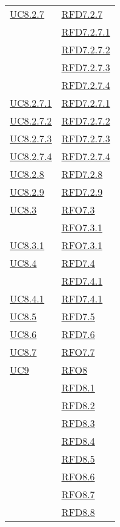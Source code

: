\begin{longtable}{|>{\centering}m{5cm}|m{5cm}<{\centering}|}
\hyperref[UC8.2.7]{UC8.2.7} & \hyperlink{RFD7.2.7}{RFD7.2.7}\\
& \hyperlink{RFD7.2.7.1}{RFD7.2.7.1}\\
& \hyperlink{RFD7.2.7.2}{RFD7.2.7.2}\\
& \hyperlink{RFD7.2.7.3}{RFD7.2.7.3}\\
& \hyperlink{RFD7.2.7.4}{RFD7.2.7.4}\\ \hline
\hyperref[UC8.2.7.1]{UC8.2.7.1} & \hyperlink{RFD7.2.7.1}{RFD7.2.7.1}\\ \hline
\hyperref[UC8.2.7.2]{UC8.2.7.2} & \hyperlink{RFD7.2.7.2}{RFD7.2.7.2}\\ \hline
\hyperref[UC8.2.7.3]{UC8.2.7.3} & \hyperlink{RFD7.2.7.3}{RFD7.2.7.3}\\ \hline
\hyperref[UC8.2.7.4]{UC8.2.7.4} & \hyperlink{RFD7.2.7.4}{RFD7.2.7.4}\\ \hline
\hyperref[UC8.2.8]{UC8.2.8} & \hyperlink{RFD7.2.8}{RFD7.2.8}\\ \hline
\hyperref[UC8.2.9]{UC8.2.9} & \hyperlink{RFD7.2.9}{RFD7.2.9}\\ \hline
\hyperref[UC8.3]{UC8.3} & \hyperlink{RFO7.3}{RFO7.3}\\
& \hyperlink{RFO7.3.1}{RFO7.3.1}\\ \hline
\hyperref[UC8.3.1]{UC8.3.1} & \hyperlink{RFO7.3.1}{RFO7.3.1}\\ \hline
\hyperref[UC8.4]{UC8.4} & \hyperlink{RFD7.4}{RFD7.4}\\
& \hyperlink{RFD7.4.1}{RFD7.4.1}\\ \hline
\hyperref[UC8.4.1]{UC8.4.1} & \hyperlink{RFD7.4.1}{RFD7.4.1}\\ \hline
\hyperref[UC8.5]{UC8.5} & \hyperlink{RFD7.5}{RFD7.5}\\ \hline
\hyperref[UC8.6]{UC8.6} & \hyperlink{RFD7.6}{RFD7.6}\\ \hline
\hyperref[UC8.7]{UC8.7} & \hyperlink{RFO7.7}{RFO7.7}\\ \hline
\hyperref[UC9]{UC9} & \hyperlink{RFO8}{RFO8}\\
& \hyperlink{RFD8.1}{RFD8.1}\\
& \hyperlink{RFD8.2}{RFD8.2}\\
& \hyperlink{RFD8.3}{RFD8.3}\\
& \hyperlink{RFD8.4}{RFD8.4}\\
& \hyperlink{RFD8.5}{RFD8.5}\\
& \hyperlink{RFO8.6}{RFO8.6}\\
& \hyperlink{RFO8.7}{RFO8.7}\\
& \hyperlink{RFD8.8}{RFD8.8}\\ \hline

\end{longtable}
